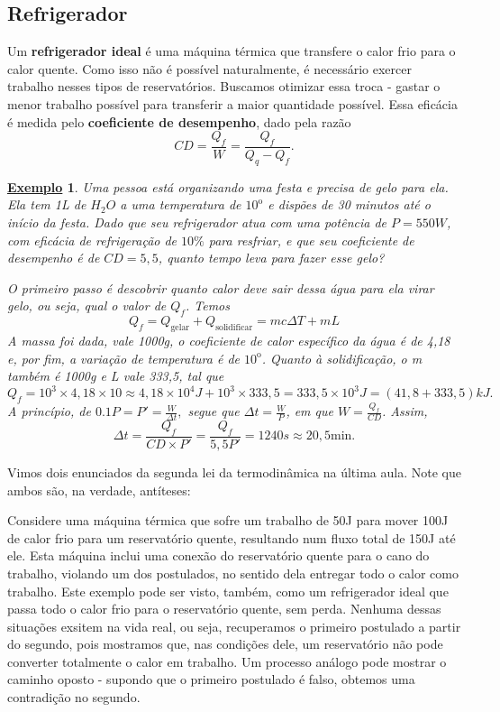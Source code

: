 \documentclass{article}
\newtheorem{example}{\underline{Exemplo}}
\begin{document}
\subsection{Refrigerador}
  Um \textbf{refrigerador ideal} é uma máquina térmica que transfere o calor frio para o calor quente. Como isso não é possível
naturalmente, é necessário exercer trabalho nesses tipos de reservatórios. Buscamos otimizar essa troca - gastar o menor
trabalho possível para transferir a maior quantidade possível. Essa eficácia é medida pelo \textbf{coeficiente de desempenho},
dado pela razão 
  \[
    \boxed{CD = \frac{Q_{f}}{W} = \frac{Q_{f}}{Q_{q}-Q_{f}}}. 
  \]
\begin{example}
  Uma pessoa está organizando uma festa e precisa de gelo para ela. Ela tem 1L de \(H_{2}O\) a uma temperatura de \({10}^{\mathrm{o}}\) e dispões de 30 minutos até
  o início da festa. Dado que seu refrigerador atua com uma potência de \(P=550W\), com eficácia de refrigeração de \(10\%\) para resfriar,
  e que seu coeficiente de desempenho é de \(CD=5,5\), quanto tempo leva para fazer esse gelo?

  O primeiro passo é descobrir quanto calor deve sair dessa água para ela virar gelo, ou seja, qual o valor de \(Q_{f}\). Temos 
  \[
    Q_{f} = Q_{\text{gelar}} + Q_{\text{solidificar}} = mc\Delta T + mL
  \]
  A massa foi dada, vale 1000g, o coeficiente de calor específico da água é de 4,18 e, por fim, a variação de temperatura é de \({10}^{\mathrm{o}}\).
  Quanto à solidificação, o m também é 1000g e L vale 333,5, tal que 
  \[
    Q_{f} = 10^{3}\times4,18\times 10\approx 4,18\times10^{4}J + 10^{3}\times 333,5 = 333,5\times 10^{3}J = (41,8+333,5)kJ.
  \]
  A princípio, de \(0.1P = P' = \frac{W}{\Delta t},\) segue que \(\Delta t = \frac{W}{P}\), em que \(W = \frac{Q_{f}}{CD}\). Assim,
  \[
    \Delta t = \frac{Q_{f}}{CD\times P'} = \frac{Q_{f}}{5,5P'} = 1240s\approx 20,5 \text{min.}
  \]
\end{example}

  Vimos dois enunciados da segunda lei da termodinâmica na última aula. Note que ambos são, na verdade,
antíteses:

  Considere uma máquina térmica que sofre um trabalho de 50J para mover 100J de calor frio para um reservatório quente, resultando
num fluxo total de 150J até ele. Esta máquina inclui uma conexão do reservatório quente para o cano do trabalho, violando um dos postulados,
no sentido dela entregar todo o calor como trabalho. Este exemplo pode ser visto, também, como um refrigerador ideal que passa todo o calor
frio para o reservatório quente, sem perda. Nenhuma dessas situações exsitem na vida real, ou seja, recuperamos o primeiro postulado a partir do segundo,
pois mostramos que, nas condições dele, um reservatório não pode converter totalmente o calor em trabalho.
Um processo análogo pode mostrar o caminho oposto - supondo que o primeiro postulado é falso, obtemos uma contradição no segundo.
\end{document}
